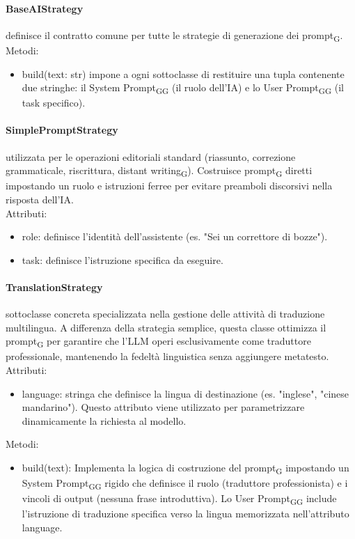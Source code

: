 \documentclass[11pt,a4paper]{article}
\newcommand{\gls}[1]{#1\textsubscript{G}}
\begin{document}
\paragraph{BaseAIStrategy} definisce il contratto comune per tutte le strategie di generazione dei \gls{prompt}.
Metodi:
\begin{itemize}
    \item build(text: str) impone a ogni sottoclasse di restituire una tupla contenente due stringhe: il \gls{System \gls{Prompt}} (il ruolo dell'IA) e lo \gls{User \gls{Prompt}} (il task specifico).
\end{itemize}
\paragraph{SimplePromptStrategy} utilizzata per le operazioni editoriali standard (riassunto, correzione grammaticale, riscrittura, \gls{distant writing}). Costruisce \gls{prompt} diretti impostando un ruolo e istruzioni ferree per evitare preamboli discorsivi nella risposta dell'IA.\\
Attributi:
\begin{itemize}
    \item role: definisce l'identità dell'assistente (es. "Sei un correttore di bozze").
    \item task: definisce l'istruzione specifica da eseguire.
\end{itemize}
\paragraph{TranslationStrategy} 
sottoclasse concreta specializzata nella gestione delle attività di traduzione multilingua. A differenza della strategia semplice, questa classe ottimizza il \gls{prompt} per garantire che l'LLM operi esclusivamente come traduttore professionale, mantenendo la fedeltà linguistica senza aggiungere metatesto.
\\Attributi:
\begin{itemize}
    \item language: stringa che definisce la lingua di destinazione (es. "inglese", "cinese mandarino"). Questo attributo viene utilizzato per parametrizzare dinamicamente la richiesta al modello.
\end{itemize}
Metodi:
\begin{itemize}
    \item build(text): Implementa la logica di costruzione del \gls{prompt} impostando un \gls{System \gls{Prompt}} rigido che definisce il ruolo (traduttore professionista) e i vincoli di output (nessuna frase introduttiva). Lo \gls{User \gls{Prompt}} include l'istruzione di traduzione specifica verso la lingua memorizzata nell'attributo language.
\end{itemize}
\end{document}

